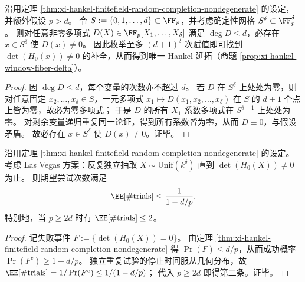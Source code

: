 \begin{proposition}\label{prop:xi-hankel-finitefield-deterministic-completion}
沿用定理 \ref{thm:xi-hankel-finitefield-random-completion-nondegenerate} 的设定，并额外假设 \(p>d\)。
令
\(
S:=\{0,1,\dots,d\}\subset \FF_p
\)，并考虑确定性网格 \(S^\delta\subset \FF_p^\delta\)。
则对任意非零多项式 \(D(X)\in \FF_p[X_1,\dots,X_\delta]\) 满足 \(\deg D\le d\)，必存在 \(x\in S^\delta\) 使 \(D(x)\neq 0\)。
因此枚举至多 \((d+1)^\delta\) 次赋值即可找到 \(\det(H_0(x))\neq 0\) 的补全，从而得到唯一 Hankel 延拓（命题 \ref{prop:xi-hankel-window-fiber-delta}）。
\end{proposition}
\begin{proof}
因 \(\deg D\le d\)，每个变量的次数亦不超过 \(d\)。
若 \(D\) 在 \(S^\delta\) 上处处为零，则对任意固定 \(x_2,\dots,x_\delta\in S\)，一元多项式
\(
x_1\mapsto D(x_1,x_2,\dots,x_\delta)
\)
在 \(S\) 的 \(d+1\) 个点上皆为零，故必为零多项式；
于是 \(D\) 的所有 \(X_1\) 系数多项式在 \(S^{\delta-1}\) 上处处为零。
对剩余变量递归重复同一论证，得到所有系数皆为零，从而 \(D\equiv 0\)，与假设矛盾。
故必存在 \(x\in S^\delta\) 使 \(D(x)\neq 0\)。证毕。
\end{proof}

\begin{corollary}\label{cor:xi-hankel-finitefield-random-completion-las-vegas-expected}
沿用定理 \ref{thm:xi-hankel-finitefield-random-completion-nondegenerate} 的设定。
考虑 Las Vegas 方案：反复独立抽取 \(X\sim\mathrm{Unif}(k^\delta)\) 直到 \(\det(H_0(X))\neq 0\) 为止。
则期望尝试次数满足
\[
\EE[\#\mathrm{trials}]
\le
\frac{1}{1-d/p}.
\]
特别地，当 \(p\ge 2d\) 时有 \(\EE[\#\mathrm{trials}]\le 2\)。
\end{corollary}
\begin{proof}
记失败事件 \(F:=\{\det(H_0(X))=0\}\)。
由定理 \ref{thm:xi-hankel-finitefield-random-completion-nondegenerate} 得 \(\Pr(F)\le d/p\)，从而成功概率 \(\Pr(F^{c})\ge 1-d/p\)。
独立重复试验的停止时间服从几何分布，故
\(
\EE[\#\mathrm{trials}]=1/\Pr(F^{c})
\le 1/(1-d/p)
\)；
代入 \(p\ge 2d\) 即得第二条。证毕。
\end{proof}

\endinput
